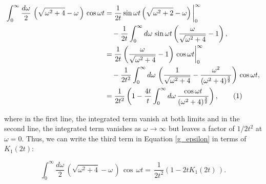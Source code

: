 \documentclass{article}
\numberwithin{equation}{section} %
\begin{document}

\begin{align*}
\int^\infty_0 \frac{d\omega}{2}\, \left(\sqrt{\omega^2 + 4} - \omega\,\right)\, \cos \omega t &= \frac{1}{2t}\sin \omega t \left(\sqrt{\omega^2 +2} - \omega\right)\bigg\vert^\infty_0\\
& \quad -\frac{1}{2t}\int^\infty_0 d\omega\, \sin \omega t \left( \frac{\omega}{\sqrt{\omega^2 +4}} - 1 \right),\\
&=\frac{1}{2t}\left(\frac{\omega}{\sqrt{\omega^2+4}} -1 \right)\,\cos \omega t \bigg\vert^\infty_0 \\
 &\quad -\frac{1}{2t^2} \int^\infty_0 d\omega \, \left(\frac{1}{\sqrt{\omega^2 + 4}} - \frac{\omega^2}{(\omega^2 +4)^{\frac{3}{2}}} \right) \, \cos \omega t,\\
&=\frac{1}{2t^2} \left( 1 - \frac{4t}{t} \int^\infty_0 d\omega \, \frac{\cos \omega t}{(\omega^2 + 4)^{\frac{3}{2}}} \right),
\tag{\refstepcounter{equation}\theequation}
\end{align*}


\noindent where in the first line, the integrated term vanish at both limits and in the second line, the integrated term vanishes as $\omega\rightarrow \infty$ but leaves a factor of $1/2t^2$ at $\omega=0$. Thus, we can write the third term in Equation \ref{g_epsilon} in terms of $K_1(2t)$:

\begin{equation}
\int^\infty_0 \frac{d\omega}{2}\, \left(\sqrt{\omega^2 + 4} - \omega\,\right)\, \cos \, \omega t  = \,\frac{1}{2t^2}( 1 - 2tK_1(2t)\,).
\end{equation}
\end{document}

